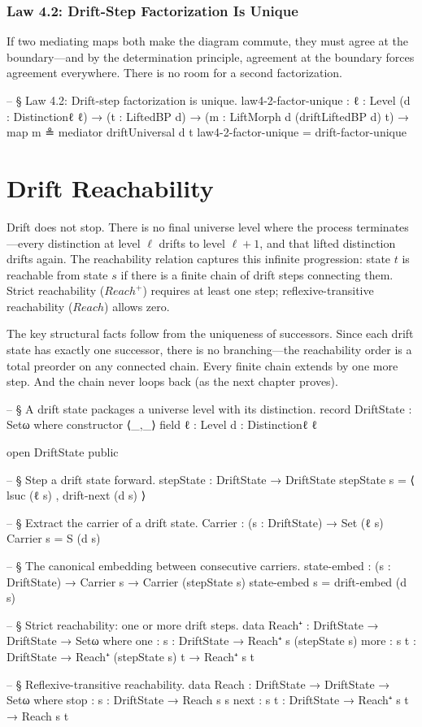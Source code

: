 \documentclass[11pt,a4paper]{book}
\def\texttt#1{#1}%
\begin{document}
\subsection{Law 4.2: Drift-Step Factorization Is Unique}

If two mediating maps both make the diagram commute, they must agree at the boundary—and by the determination principle, agreement at the boundary forces agreement everywhere. There is no room for a second factorization.

\begin{code}
-- § Law 4.2: Drift-step factorization is unique.
law4-2-factor-unique :
  {ℓ : Level} (d : Distinctionℓ ℓ) → (t : LiftedBP d) →
  (m : LiftMorph d (driftLiftedBP d) t) →
  map m ≗ mediator driftUniversal d t
law4-2-factor-unique = drift-factor-unique
\end{code}

\chapter{Drift Reachability}

Drift does not stop. There is no final universe level where the process terminates—every distinction at level $\ell$ drifts to level $\ell + 1$, and that lifted distinction drifts again. The reachability relation captures this infinite progression: state $t$ is reachable from state $s$ if there is a finite chain of drift steps connecting them. Strict reachability ($\texttt{Reach}^+$) requires at least one step; reflexive-transitive reachability ($\texttt{Reach}$) allows zero.

The key structural facts follow from the uniqueness of successors. Since each drift state has exactly one successor, there is no branching—the reachability order is a total preorder on any connected chain. Every finite chain extends by one more step. And the chain never loops back (as the next chapter proves).

\begin{code}
-- § A drift state packages a universe level with its distinction.
record DriftState : Setω where
  constructor ⟨_,_⟩
  field
    ℓ : Level
    d : Distinctionℓ ℓ

open DriftState public

-- § Step a drift state forward.
stepState : DriftState → DriftState
stepState s = ⟨ lsuc (ℓ s) , drift-next (d s) ⟩

-- § Extract the carrier of a drift state.
Carrier : (s : DriftState) → Set (ℓ s)
Carrier s = S (d s)

-- § The canonical embedding between consecutive carriers.
state-embed : (s : DriftState) → Carrier s → Carrier (stepState s)
state-embed s = drift-embed (d s)

-- § Strict reachability: one or more drift steps.
data Reach⁺ : DriftState → DriftState → Setω where
  one  : {s : DriftState} → Reach⁺ s (stepState s)
  more : {s t : DriftState} → Reach⁺ (stepState s) t → Reach⁺ s t

-- § Reflexive-transitive reachability.
data Reach : DriftState → DriftState → Setω where
  stop : {s : DriftState} → Reach s s
  next : {s t : DriftState} → Reach⁺ s t → Reach s t
\end{code}
\end{document}
